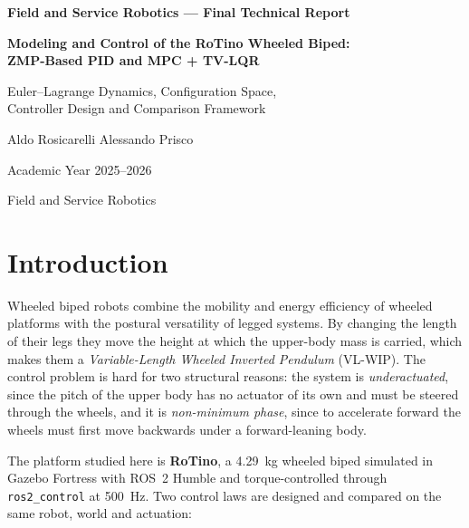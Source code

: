 \documentclass[11pt,a4paper]{article}
\begin{document}
\begin{titlepage}
    \centering
    \vspace*{2cm}
    {\Large\bfseries Field and Service Robotics --- Final Technical Report\par}
    \vspace{1.5cm}
    {\LARGE\bfseries Modeling and Control of the RoTino Wheeled Biped:\\[6pt]
    ZMP-Based PID and MPC + TV-LQR\par}
    \vspace{1cm}
    {\large Euler--Lagrange Dynamics, Configuration Space,\\ Controller Design and Comparison Framework\par}
    \vspace{2cm}
    {\large Aldo Rosicarelli \quad Alessando Prisco\par}
    \vspace{0.5cm}
    {\large Academic Year 2025--2026\par}
    \vfill
    {\large Field and Service Robotics\par}
\end{titlepage}

\tableofcontents
\newpage

\section{Introduction}
\label{sec:intro}

Wheeled biped robots combine the mobility and energy efficiency of wheeled platforms with the
postural versatility of legged systems.  By changing the length of their legs they move the
height at which the upper-body mass is carried, which makes them a \emph{Variable-Length
Wheeled Inverted Pendulum} (VL-WIP).  The control problem is hard for two structural reasons:
the system is \emph{underactuated}, since the pitch of the upper body has no actuator of its
own and must be steered through the wheels, and it is \emph{non-minimum phase}, since to
accelerate forward the wheels must first move backwards under a forward-leaning body.

The platform studied here is \textbf{RoTino}, a 4.29~kg wheeled biped simulated in Gazebo
Fortress with ROS~2 Humble and torque-controlled through \texttt{ros2\_control} at 500~Hz.
Two control laws are designed and compared on the same robot, world and actuation:
\end{document}
